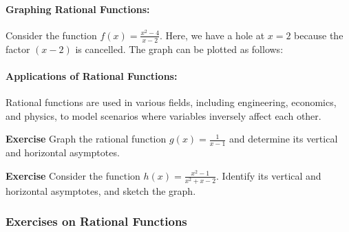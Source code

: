 \documentclass[a4paper,12pt]{book}
\newenvironment{exercise}[1][]
  {\par\medskip\noindent\textbf{Exercise #1} \rmfamily}
  {\medskip}
\begin{document}
\paragraph{Graphing Rational Functions:}
Consider the function \( f(x) = \frac{x^2 - 4}{x - 2} \). Here, we have a hole at \( x = 2 \) because the factor \( (x - 2) \) is cancelled. The graph can be plotted as follows:


\paragraph{Applications of Rational Functions:}
Rational functions are used in various fields, including engineering, economics, and physics, to model scenarios where variables inversely affect each other.

\begin{exercise}
Graph the rational function \( g(x) = \frac{1}{x - 1} \) and determine its vertical and horizontal asymptotes.
\end{exercise}

\begin{exercise}
Consider the function \( h(x) = \frac{x^2 - 1}{x^2 + x - 2} \). Identify its vertical and horizontal asymptotes, and sketch the graph.
\end{exercise}

\subsubsection*{Exercises on Rational Functions}
\end{document}
